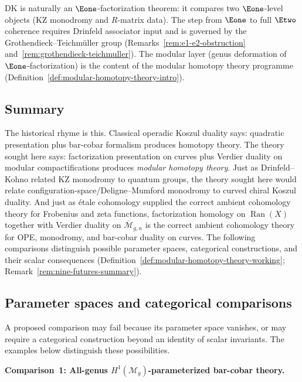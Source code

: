 \begin{remark}
DK is naturally an $\Eone$-factorization theorem: it compares two
$\Eone$-level objects (KZ monodromy and $R$-matrix data).  The step
from $\Eone$ to full $\Etwo$ coherence requires Drinfeld associator
input and is governed by the Grothendieck--Teichm\"uller group
(Remarks~\ref{rem:e1-e2-obstruction}
and~\ref{rem:grothendieck-teichmuller}).  The modular layer (genus
deformation of $\Eone$-factorization) is the content of the modular
homotopy theory programme
(Definition~\ref{def:modular-homotopy-theory-intro}).
\end{remark}

\subsection{Summary}

The historical rhyme is this.  Classical operadic Koszul duality
says: quadratic presentation plus bar-cobar formalism produces
homotopy theory.  The theory sought here says: factorization
presentation on curves plus Verdier duality on modular
compactifications produces \emph{modular homotopy theory}.  Just as
Drinfeld--Kohno related KZ monodromy to quantum groups, the theory
sought here would relate configuration-space/Deligne--Mumford
monodromy to curved chiral Koszul duality.  And just as \'etale
cohomology supplied the correct ambient cohomology theory for
Frobenius and zeta functions, factorization homology on
$\operatorname{Ran}(X)$ together with Verdier duality on
$\overline{\mathcal{M}}_{g,n}$ is the correct ambient cohomology
theory for OPE, monodromy, and bar-cobar duality on curves.
The following comparisons distinguish possible parameter spaces,
categorical constructions, and their scalar consequences
(Definition~\ref{def:modular-homotopy-theory-working};
Remark~\ref{rem:nine-futures-summary}).

\subsection{Parameter spaces and categorical comparisons}\label{subsec:nine-futures}

A proposed comparison may fail because its parameter space vanishes, or may
require a categorical construction beyond an identity of scalar invariants.
The examples below distinguish these possibilities.

\medskip

\noindent\textbf{Comparison~1: All-genus $H^1(\mathcal{M}_g)$-parameterized
bar-cobar theory.}

